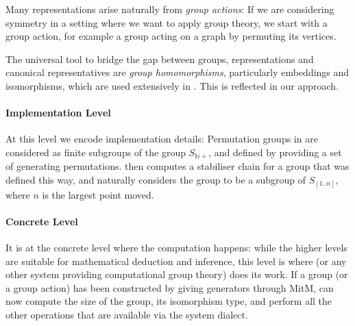 Many representations arise naturally from \emph{group actions}: If we are
considering symmetry in a setting where we want to apply group theory, we start
with a group action, for example a group acting on a graph by permuting its
vertices.


The universal tool to bridge the gap between groups, representations and
canonical representatives are \emph{group homomorphisms}, particularly
embeddings and isomorphisms, which are used extensively in \GAP. This is
reflected in our approach.

\paragraph{Implementation Level}
At this level we encode implementation details: Permutation groups in \GAP
are considered as finite subgroups of the group $S_{\mathbb{N}+}$, and defined by
providing a set of generating permutations. \GAP then computes a stabiliser chain
for a group that was defined this way, and naturally considers the group to be a
subgroup of $S_{[1..n]}$, where $n$ is the largest point moved.

\paragraph{Concrete Level}
It is at the concrete level where the computation happens: while the higher levels
are suitable for mathematical deduction and inference, this level is where \GAP
(or any other system providing computational group theory) does its work.
If a group (or a group action) has been constructed by giving generators
through MitM, \GAP can now compute the size of the group, its isomorphism type,
and perform all the other operations that are available via the \GAP system
dialect.

